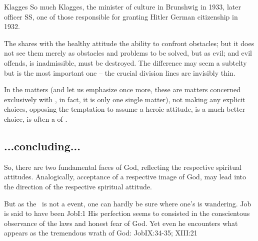 \citet{It does not matter whether that which should be defeated is described as
  weakness or defect, or else as destructive powers; that against which
  one is fighting is always evil, and that in the name of which one is fighting
  is always good. Certainty of clear contradiction between good and evil will is
  indispensable and infallible mark of heroic world view.}{Klagges}{}
So much Klagges, the minister of culture in Brunshwig in 1933, later officer SS,
  one of those responsible for granting Hitler German citizenship in 1932.

The  shares with the healthy attitude the ability to
confront obstacles; but it 
does not see them merely as obstacles and problems to be solved, but as evil;
and evil offends, is inadmissible, must be destroyed.
The difference may seem a subtelty but is the most important one -- the crucial
division lines are invisibly thin.

In the  matters (and let us emphasize once more, these are matters
concerned exclusively with , in fact, it is only one single matter),
not making any explicit choices, opposing the temptation to assume a heroic attitude, is
a much better choice, is often a  of \yes. 



\subsection{...concluding...}
So, there are two fundamental faces of God, reflecting the respective spiritual
attitudes. Analogically, acceptance of a respective image of God, may lead into
the direction of the respective spiritual attitude.


But as the \sch\ is not a  event, one can hardly be sure where one's
 is wandering. Job is said to have been \citet{perfect and upright,
  and one that feared God, and eschewed evil.}{Job}{I:1} His perfection seems to
consisted in the conscientous observance of the laws and honest fear of God. Yet
even he encounters what appears as the tremendous wrath of God: \citet{Let him
  take his rod away from me, and let not his fear terrify me: Then would I
  speak, and not fear him; but it is not so with me. [...]  Withdraw thine hand
  far from me: and let not thy dread make me afraid.}{Job}{IX:34-35; XIII:21}

